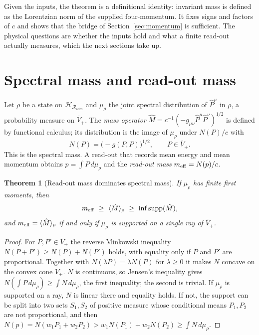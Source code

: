\documentclass[12pt,a4paper]{article}
\newtheorem{theorem}{Theorem}[section]
\theoremstyle{definition}
\theoremstyle{remark}
\newcommand{\Rout}{\mathcal{R}_{\mathrm{adm}}}
\begin{document}
Given the inputs, the theorem is a definitional identity: invariant mass is defined as the Lorentzian norm of the supplied four-momentum. It fixes signs and factors of $c$ and shows that the bridge of Section~\ref{sec:momentum} is sufficient. The physical questions are whether the inputs hold and what a finite read-out actually measures, which the next sections take up.

\section{Spectral mass and read-out mass}
\label{sec:readout}

Let $\rho$ be a state on $\mathcal H_{\Rout}$ and $\mu_\rho$ the joint spectral distribution of $\hat P^\mu$ in $\rho$, a probability measure on $\overline V_+$. The \emph{mass operator} $\hat M=c^{-1}(-g_{\mu\nu}\hat P^\mu\hat P^\nu)^{1/2}$ is defined by functional calculus; its distribution is the image of $\mu_\rho$ under $N(P)/c$ with
\begin{equation}
N(P)=\bigl(-g(P,P)\bigr)^{1/2},\qquad P\in\overline V_+ .
\end{equation}
This is the spectral mass. A read-out that records mean energy and mean momentum obtains $p=\int P\,d\mu_\rho$ and the \emph{read-out mass} $m_{\rm eff}=N(p)/c$.

\begin{theorem}[Read-out mass dominates spectral mass]
\label{thm:readout}
If $\mu_\rho$ has finite first moments, then
\begin{equation}
m_{\rm eff}\ \ge\ \langle\hat M\rangle_\rho\ \ge\ \inf\operatorname{supp}(\hat M),
\end{equation}
and $m_{\rm eff}=\langle\hat M\rangle_\rho$ if and only if $\mu_\rho$ is supported on a single ray of $\overline V_+$.
\end{theorem}

\begin{proof}
For $P,P'\in\overline V_+$ the reverse Minkowski inequality $N(P+P')\ge N(P)+N(P')$ holds, with equality only if $P$ and $P'$ are proportional. Together with $N(\lambda P)=\lambda N(P)$ for $\lambda\ge0$ it makes $N$ concave on the convex cone $\overline V_+$. $N$ is continuous, so Jensen's inequality gives $N(\int P\,d\mu_\rho)\ge\int N\,d\mu_\rho$, the first inequality; the second is trivial. If $\mu_\rho$ is supported on a ray, $N$ is linear there and equality holds. If not, the support can be split into two sets $S_1,S_2$ of positive measure whose conditional means $P_1,P_2$ are not proportional, and then $N(p)=N(w_1P_1+w_2P_2)>w_1N(P_1)+w_2N(P_2)\ge\int N\,d\mu_\rho$.
\end{proof}
\end{document}
